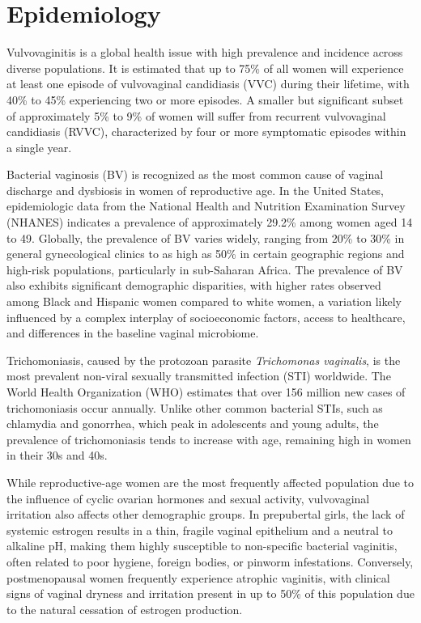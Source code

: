 \section*{Epidemiology}
Vulvovaginitis is a global health issue with high prevalence and incidence across diverse populations. It is estimated that up to 75\% of all women will experience at least one episode of vulvovaginal candidiasis (VVC) during their lifetime, with 40\% to 45\% experiencing two or more episodes. A smaller but significant subset of approximately 5\% to 9\% of women will suffer from recurrent vulvovaginal candidiasis (RVVC), characterized by four or more symptomatic episodes within a single year.

Bacterial vaginosis (BV) is recognized as the most common cause of vaginal discharge and dysbiosis in women of reproductive age. In the United States, epidemiologic data from the National Health and Nutrition Examination Survey (NHANES) indicates a prevalence of approximately 29.2\% among women aged 14 to 49. Globally, the prevalence of BV varies widely, ranging from 20\% to 30\% in general gynecological clinics to as high as 50\% in certain geographic regions and high-risk populations, particularly in sub-Saharan Africa. The prevalence of BV also exhibits significant demographic disparities, with higher rates observed among Black and Hispanic women compared to white women, a variation likely influenced by a complex interplay of socioeconomic factors, access to healthcare, and differences in the baseline vaginal microbiome.

Trichomoniasis, caused by the protozoan parasite \textit{Trichomonas vaginalis}, is the most prevalent non-viral sexually transmitted infection (STI) worldwide. The World Health Organization (WHO) estimates that over 156 million new cases of trichomoniasis occur annually. Unlike other common bacterial STIs, such as chlamydia and gonorrhea, which peak in adolescents and young adults, the prevalence of trichomoniasis tends to increase with age, remaining high in women in their 30s and 40s.

While reproductive-age women are the most frequently affected population due to the influence of cyclic ovarian hormones and sexual activity, vulvovaginal irritation also affects other demographic groups. In prepubertal girls, the lack of systemic estrogen results in a thin, fragile vaginal epithelium and a neutral to alkaline pH, making them highly susceptible to non-specific bacterial vaginitis, often related to poor hygiene, foreign bodies, or pinworm infestations. Conversely, postmenopausal women frequently experience atrophic vaginitis, with clinical signs of vaginal dryness and irritation present in up to 50\% of this population due to the natural cessation of estrogen production.

